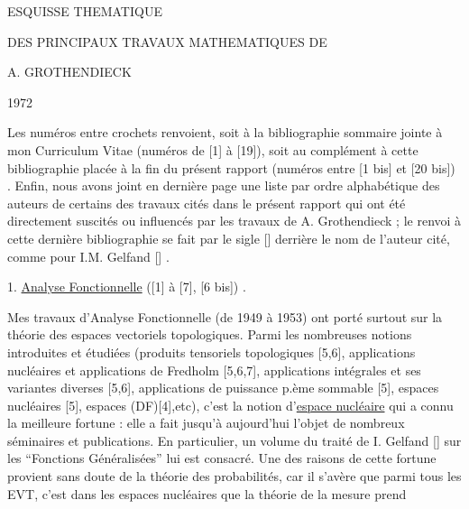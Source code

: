 ESQUISSE THEMATIQUE

DES PRINCIPAUX TRAVAUX MATHEMATIQUES DE

A. GROTHENDIECK

1972

Les numéros entre crochets renvoient, soit à
la bibliographie sommaire jointe à mon Curriculum Vitae
(numéros de [1] à [19]), soit au complément à cette
bibliographie placée à la fin du présent rapport (numéros
entre [1 bis] et [20 bis]) . Enfin, nous avons joint
en dernière page une liste par ordre alphabétique des
auteurs de certains des travaux cités dans le présent
rapport qui ont été directement suscités ou influencés
par les travaux de A. Grothendieck ; le renvoi à cette
dernière bibliographie se fait par le sigle [\hand{\unsure{$\ast$}}] derrière
le nom de l'auteur cité, comme pour I.M. Gelfand [\hand{\unsure{$\ast$}}] .

1. \uline{Analyse Fonctionnelle} ([1] à [7], [6 bis]) .

Mes travaux d'Analyse Fonctionnelle (de 1949
à 1953) ont porté surtout sur la théorie des espaces
vectoriels topologiques. Parmi les nombreuses notions
introduites et étudiées (produits tensoriels topologiques
[5,6], applications nucléaires et applications de
Fredholm [5,6,7], applications intégrales et ses
variantes diverses [5,6], applications de puissance p.ème
sommable [5], espaces nucléaires [5], espaces (DF)[4],etc),
c'est la notion d'\uline{espace nucléaire} qui a connu la meilleure
fortune : elle a fait jusqu'à aujourd'hui l'objet de
nombreux séminaires et publications. En particulier,
un volume du traité de I. Gelfand [\hand{\unsure{$\ast$}}] sur les ``Fonctions
Généralisées'' lui est consacré. Une des raisons de cette
fortune provient sans doute de la théorie des probabilités,
car il s'avère que parmi tous les EVT, c'est dans les
espaces nucléaires que la théorie de la mesure prend

